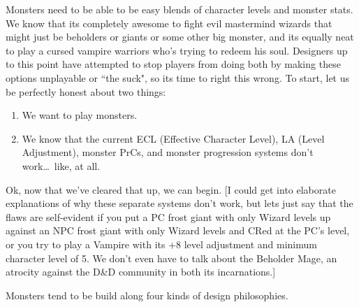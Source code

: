 Monsters need to be able to be easy blends of character levels and monster stats. We know that its completely awesome to fight evil mastermind wizards that might just be beholders or giants or some other big monster, and its equally neat to play a cursed vampire warriors who's trying to redeem his soul. Designers up to this point have attempted to stop players from doing both by making these options unplayable or ``the suck", so its time to right this wrong. To start, let us be perfectly honest about two things:

\begin{enumerate}\itemspace
   \item We want to play monsters.
   \item We know that the current ECL (Effective Character Level), LA (Level Adjustment), monster PrCs, and monster progression systems don't work\ldots\  like, at all.
\end{enumerate}

Ok, now that we've cleared that up, we can begin. [I could get into elaborate explanations of why these separate systems don't work, but lets just say that the flaws are self-evident if you put a PC frost giant with only Wizard levels up against an NPC frost giant with only Wizard levels and CRed at the PC's level, or you try to play a Vampire with its +8 level adjustment and minimum character level of 5. We don't even have to talk about the Beholder Mage, an atrocity against the D\&D community in both its incarnations.]

Monsters tend to be build along four kinds of design philosophies.


